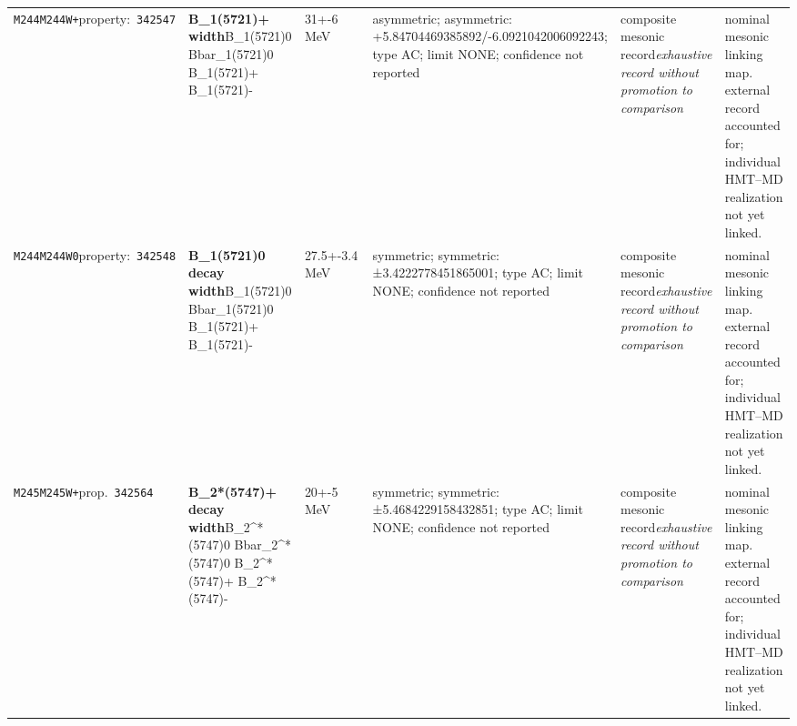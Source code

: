 \begin{landscape}
\begin{longtable}{L{1.85cm}L{4.45cm}L{2.35cm}L{4.05cm}L{3.35cm}L{7.15cm}}
\texttt{M244}\newline \texttt{M244W+}\newline property:\ \texttt{342547} & \textbf{B\_\allowbreak{}1(5721)+ width}\newline B\_\allowbreak{}1(5721)0 \textbar{}\allowbreak{} Bbar\_\allowbreak{}1(5721)0 \textbar{}\allowbreak{} B\_\allowbreak{}1(5721)+ \textbar{}\allowbreak{} B\_\allowbreak{}1(5721)- & 31+-6\,MeV & asymmetric; asymmetric: +5.84704469385892/-6.0921042006092243; type AC; limit NONE; confidence not reported & composite mesonic record\newline \emph{exhaustive record without promotion to comparison} & nominal mesonic linking map. external record accounted for; individual HMT--MD realization not yet linked. \\
\texttt{M244}\newline \texttt{M244W0}\newline property:\ \texttt{342548} & \textbf{B\_\allowbreak{}1(5721)0 decay width}\newline B\_\allowbreak{}1(5721)0 \textbar{}\allowbreak{} Bbar\_\allowbreak{}1(5721)0 \textbar{}\allowbreak{} B\_\allowbreak{}1(5721)+ \textbar{}\allowbreak{} B\_\allowbreak{}1(5721)- & 27.5+-3.4\,MeV & symmetric; symmetric: ±3.4222778451865001; type AC; limit NONE; confidence not reported & composite mesonic record\newline \emph{exhaustive record without promotion to comparison} & nominal mesonic linking map. external record accounted for; individual HMT--MD realization not yet linked. \\
\texttt{M245}\newline \texttt{M245W+}\newline prop.\ \texttt{342564} & \textbf{B\_\allowbreak{}2*(5747)+ decay width}\newline B\_\allowbreak{}2\textasciicircum{}*(5747)0 \textbar{}\allowbreak{} Bbar\_\allowbreak{}2\textasciicircum{}*(5747)0 \textbar{}\allowbreak{} B\_\allowbreak{}2\textasciicircum{}*(5747)+ \textbar{}\allowbreak{} B\_\allowbreak{}2\textasciicircum{}*(5747)- & 20+-5\,MeV & symmetric; symmetric: ±5.4684229158432851; type AC; limit NONE; confidence not reported & composite mesonic record\newline \emph{exhaustive record without promotion to comparison} & nominal mesonic linking map. external record accounted for; individual HMT--MD realization not yet linked. \\

\end{longtable}
\end{landscape}
